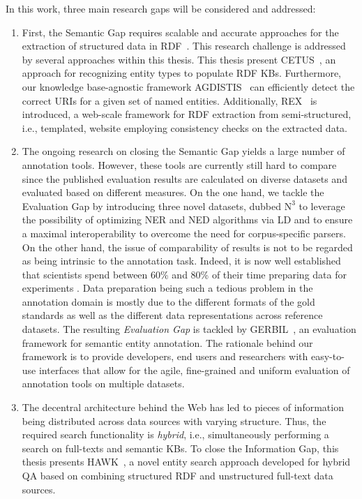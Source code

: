 In this work, three main research gaps will be considered and addressed:
\begin{enumerate}
\item 
First, the Semantic Gap requires scalable and accurate approaches for the extraction of structured data in \ac{RDF}~\cite{rdfprimer}.
This research challenge is addressed by several approaches within this thesis.
This thesis present CETUS~\cite{CETUS_2015}, an approach for recognizing entity types to populate \ac{RDF} \ac{KB}s. 
Furthermore, our knowledge base-agnostic framework AGDISTIS~\cite{agdistis_iswc} can efficiently detect the correct URIs for a given set of named entities.
Additionally, REX~\cite{rex} is introduced, a web-scale framework for \ac{RDF} extraction from semi-structured, i.e., templated, website employing consistency checks on the extracted data.
\item 
The ongoing research on closing the Semantic Gap yields a large number of annotation tools.
However, these tools are currently still hard to compare since the published evaluation results are calculated on diverse datasets and evaluated based on different measures.
On the one hand, we tackle the Evaluation Gap by introducing three novel datasets, dubbed $\mbox{N}^3$ to leverage the possibility of optimizing NER and NED algorithms via \ac{LD} and to ensure a maximal interoperability to overcome the need for corpus-specific parsers. 
On the other hand, the issue of  comparability of results is not to be regarded as being intrinsic to the annotation task. 
Indeed, it is now well established that scientists spend between 60\% and 80\% of their time preparing data for experiments \cite{GIL2014,jermyn1999preparing,peng2011reproducible}. 
Data preparation being such a tedious problem in the annotation domain is mostly due to the different formats of the gold standards as well as the different data representations across reference datasets.
The resulting \emph{Evaluation Gap} is tackled by GERBIL~\cite{GERBIL}, an evaluation framework for semantic entity annotation. 
The rationale behind our framework is to provide developers, end users and researchers with easy-to-use interfaces that allow for the agile, fine-grained and uniform evaluation of annotation tools on multiple datasets.
\item 
The decentral architecture behind the Web has led to pieces of information being distributed across data sources with varying structure. 
Thus, the required search functionality is \emph{hybrid}, i.e., simultaneously performing a search on full-texts and semantic \ac{KB}s.
To close the {Information Gap}, this thesis presents HAWK~\cite{hawk_2015}, a novel entity search approach developed for hybrid \ac{QA} based on combining structured \ac{RDF} and unstructured full-text data sources.
\end{enumerate}


